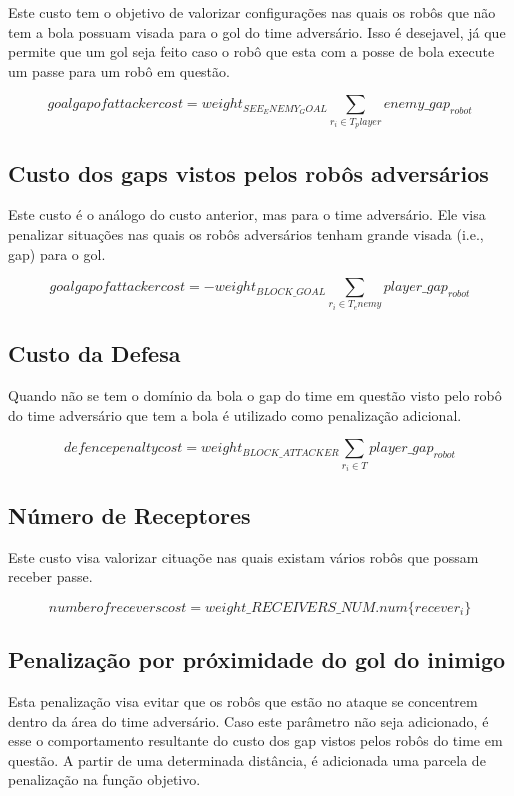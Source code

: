 Este custo tem o objetivo de valorizar configurações nas quais
os robôs que não tem a bola possuam visada para o gol do time
adversário. Isso
é desejavel, já que permite que um gol seja feito caso o robô
que esta com a posse de bola execute um passe para um robô
em questão.

\begin{dmath}
   goal gap of attacker cost = weight_{SEE_ENEMY_GOAL}
    \sum_{r_i \in T_player} enemy{\_}gap_{robot}
\end{dmath}

\subsection{Custo dos gaps vistos pelos robôs adversários}

Este custo é o análogo do custo anterior, mas para o
time adversário. Ele visa penalizar situações nas quais
os robôs adversários tenham grande visada (i.e., gap)
para o gol. 

\begin{dmath}
   goal gap of attacker cost = - weight_{BLOCK{\_}GOAL}
    \sum_{r_i \in T_enemy} player{\_}gap_{robot}
\end{dmath}

\subsection{Custo da Defesa}
Quando não se tem o domínio da bola o gap do time em questão
visto pelo robô do time adversário que tem a bola é utilizado
como penalização adicional.

\begin{dmath}
  defence penalty cost = weight_{BLOCK{\_}ATTACKER}
   \sum_{r_i \in T} player{\_}gap_{robot}
\end{dmath}

\subsection{Número de Receptores}

Este custo visa valorizar cituaçõe nas quais existam
vários robôs que possam receber passe.

\begin{dmath}
  number of recevers cost = weight{\_}RECEIVERS{\_}NUM . 
   num \lbrace recever_i \rbrace
\end{dmath}

\subsection{Penalização por próximidade do gol do inimigo}
Esta penalização visa evitar que os robôs que estão no ataque
se concentrem dentro da área do time adversário. Caso este
parâmetro não seja adicionado, é esse o comportamento resultante
do custo dos gap vistos pelos robôs do time em questão. 
A partir de uma determinada distância, é adicionada uma parcela
de penalização na função objetivo.

